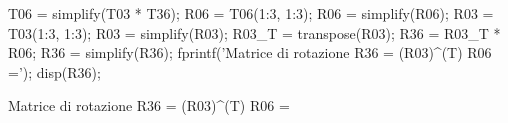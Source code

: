 \documentclass[11pt, a4paper]{article}
\begin{document}
\begin{matlabcode}
T06 = simplify(T03 * T36);
R06 = T06(1:3, 1:3);
R06 = simplify(R06);
R03 = T03(1:3, 1:3);
R03 = simplify(R03);
R03_T = transpose(R03);
R36 = R03_T * R06;
R36 = simplify(R36);
fprintf('Matrice di rotazione R36 = (R03)^(T) R06 =\n');
disp(R36);
\end{matlabcode}
\begin{matlaboutput}
Matrice di rotazione R36 = (R03)^(T) R06 =
\end{matlaboutput}
\begin{matlabsymbolicoutput}
\end{matlabsymbolicoutput}
\end{document}
